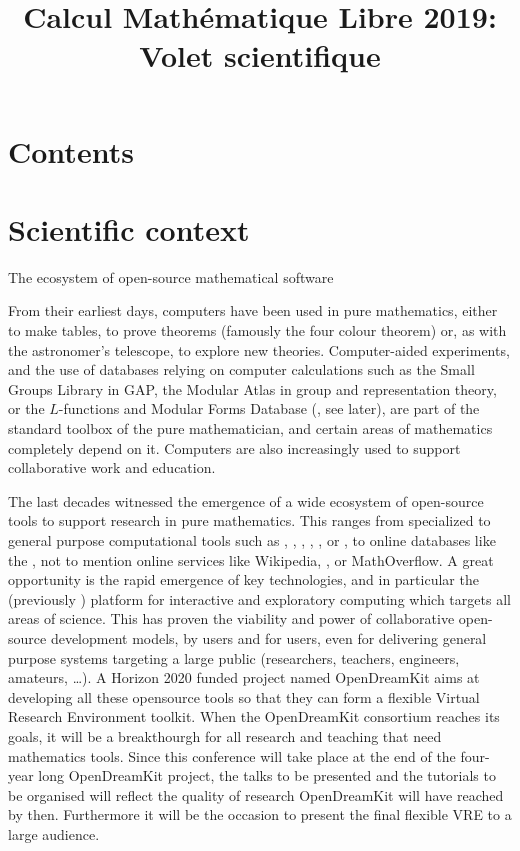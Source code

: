 \documentclass[12pt]{amsart}
\makeatletter
\def\subsection{\@startsection{subsection}{2}%
  \z@{.3\linespacing\@plus.5\linespacing}{.1\linespacing}%
  {\normalfont\bfseries}}
\makeatother
\begin{document}
\title{Calcul Mathématique Libre 2019:\\Volet scientifique}
\maketitle
\thispagestyle{empty}

\renewcommand{\contentsname}{}
\section*{Contents}
\tableofcontents

\section{Scientific context}

\subsection{The ecosystem of open-source mathematical software}

From their earliest days, computers have been used in pure
mathematics, either to make tables, to prove theorems (famously the
four colour theorem) or, as with the astronomer's telescope, to
explore new theories. Computer-aided experiments, and the use of
databases relying on computer calculations such as the Small Groups
Library in GAP, the Modular Atlas in group and representation theory,
or the $L$-functions and Modular Forms Database (\LMFDB, see later),
are part of the standard toolbox of the pure mathematician, and
certain areas of mathematics completely depend on it. Computers are
also increasingly used to support collaborative work and education.

The last decades witnessed the emergence of a wide ecosystem of
open-source tools to support research in pure mathematics. This ranges
from specialized to general purpose computational tools such as \GAP,
\PariGP, \Linbox, \MPIR, \Sage, or \Singular, to online databases
like the \LMFDB, not to mention online services like Wikipedia,
\Arxiv, or MathOverflow. A great opportunity is the rapid emergence of
key technologies, and in particular the \Jupyter (previously \IPython)
platform for interactive and exploratory computing which targets all
areas of science. This has proven the viability and power of
collaborative open-source development models, by users and for users,
even for delivering general purpose systems targeting a large public
(researchers, teachers, engineers, amateurs, \ldots). A Horizon 2020 funded
 project named OpenDreamKit aims at developing all these opensource
tools so that they can form a flexible Virtual Research Environment toolkit. 
When the OpenDreamKit consortium reaches its goals, it will be a breakthourgh for
all research and teaching that need mathematics tools.
Since this conference will take place at the end of the four-year long OpenDreamKit
project, the talks to be presented and the tutorials to be organised 
will reflect the quality of research OpenDreamKit will have reached by
then. Furthermore it will be the occasion to present the final flexible
VRE to a large audience.
\end{document}
